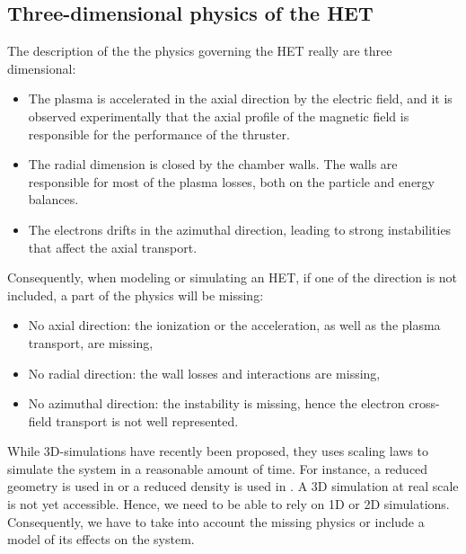 \subsection*{Three-dimensional physics of the HET}
\label{sec-3Dphi}

The description of the the physics governing the \ac{HET} really are three dimensional\string:
\begin{itemize}
  \item The plasma is accelerated in the axial direction by the electric field, and it is observed experimentally that the axial profile of the magnetic field is responsible for the performance of the thruster.
  \item The radial dimension is closed by the chamber walls. The walls are responsible for most of the plasma losses, both on the particle and energy balances.
  \item The electrons drifts in the azimuthal direction, leading to strong instabilities that affect the axial transport.
\end{itemize}

Consequently, when modeling or simulating an \ac{HET}, if one of the direction is not included, a part of the physics will be missing\string:
\begin{itemize}
  \item No axial direction\string: the ionization or the acceleration, as well as the plasma transport, are missing,
  \item No radial direction\string: the wall losses and interactions are missing,
  \item No azimuthal direction\string: the instability is missing, hence the electron cross-field transport is not well represented.
\end{itemize}

While \ac{3D}-simulations have recently been proposed, they uses scaling laws to simulate the system in a reasonable amount of time\citep{taccogna2019a}.
For instance, a reduced geometry is used in \citet{taccogna2018} or a reduced density is used in \citet{fubiani2018a}.
A \ac{3D} simulation at real scale is not yet accessible.
Hence, we need to be able to rely on \ac{1D} or \ac{2D} simulations.
Consequently, we have to take into account the missing physics or include a model of its effects on the system.
